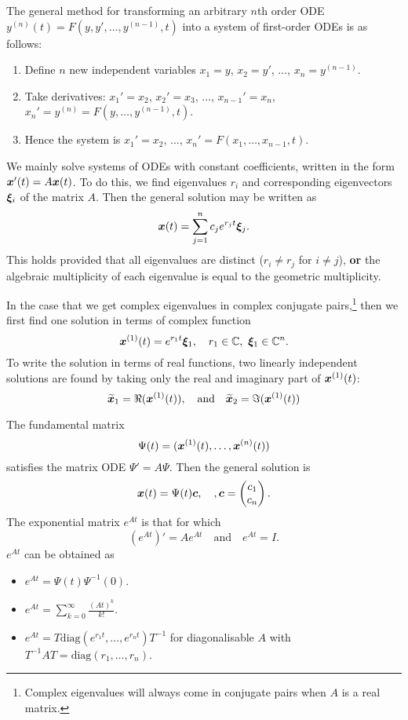 The general method for transforming an arbitrary $n$th order ODE $y^{(n)}(t) = F(y, y', \ldots, y^{(n-1)}, t)$ into a system of first-order ODEs is as follows:
\begin{enumerate}
	\item Define $n$ new independent variables $x_1 = y$, $x_2 = y'$, $\ldots$, $x_n = y^{(n-1)}$.
	\item{Take derivatives: $x_1' = x_2$, $x_2' = x_3$, $\ldots$, $x_{n-1}' = x_n$, $x_n' = y^{(n)} = F(y, \ldots, y^{(n-1)}, t)$.}
	\item{Hence the system is $x_1' = x_2$, $\ldots$, $x_n' = F(x_1, \ldots, x_{n-1}, t)$.}
\end{enumerate}

We mainly solve systems of ODEs with constant coefficients, written in the form $\bm{x}'(t) = A\bm{x}(t)$. To do this, we find eigenvalues $r_i$ and corresponding eigenvectors $\bm{\xi}_i$ of the matrix $A$. Then the general solution may be written as
\[
\bm{x}(t) = \sum_{j=1}^n c_j e^{r_jt} \bm{\xi}_j.
\]
This holds provided that all eigenvalues are distinct ($r_i \neq r_j$ for $i \neq j$), \textbf{or} the algebraic multiplicity of each eigenvalue is equal to the geometric multiplicity.

In the case that we get complex eigenvalues in complex conjugate pairs,\footnote{Complex eigenvalues will always come in conjugate pairs when $A$ is a real matrix.} then we first find one solution in terms of complex function
\[
\bm{x}^{(1)}(t) = e^{r_1t}\bm{\xi}_1, \quad r_1 \in \mathbb{C}, \,\,\bm{\xi}_1 \in \mathbb{C}^n.
\]
To write the solution in terms of real functions, two linearly independent solutions are found by taking only the real and imaginary part of $\bm{x}^{(1)}(t)$:
\[
\widetilde{\bm{x}}_1 = \Re(\bm{x}^{(1)}(t)), \quad \text{and} \quad \widetilde{\bm{x}}_2 = \Im(\bm{x}^{(1)}(t))
\]

The fundamental matrix
\[
\Psi(t) = (\bm{x}^{(1)}(t), \dots, \bm{x}^{(n)}(t))
\]
satisfies the matrix ODE $\Psi' = A\Psi$. Then the general solution is
\[
\bm{x}(t) = \Psi(t) \bm{c}, \quad, \bm{c} = \begin{pmatrix}c_1 \\ c_n\end{pmatrix}.
\]
The exponential matrix $e^{At}$ is that for which
\[
\left(e^{At}\right)' = Ae^{At} \quad \text{and} \quad e^{At} = I.
\]
$e^{At}$ can be obtained as
\begin{itemize}
	\item $e^{At} = \Psi(t)\Psi^{-1}(0)$.
	\item $e^{At} = \sum_{k=0}^{\infty} \frac{(At)^k}{k!}$.
	\item $e^{At} = T \text{diag}(e^{r_1t}, \dots, e^{r_nt})T^{-1}$ for diagonalisable $A$ with $T^{-1}AT = \text{diag}(r_1, \dots, r_n)$.
\end{itemize}

